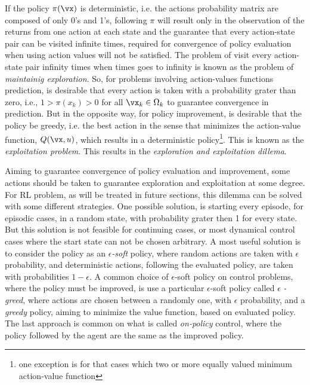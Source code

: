 If the policy $\pi(\vx)$ is deterministic, i.e. the actions probability matrix are composed of only 0's and 1's, following $ \pi$ will result only in the observation of the returns from one action at each state and the guarantee that every action-state pair can be visited infinite times, required for convergence of policy evaluation when using action values will not be satisfied.
The problem of visit every action-state pair infinity times when times goes to infinity is known as the problem of \textit{maintainig exploration}. So, for problems involving action-values functions prediction, is desirable that every action is taken with a probability grater than zero, i.e., $1 > \pi(x_k) > 0$ for all $\vx_k \in \Omega_k$ to guarantee convergence in prediction. But in the opposite way, for policy improvement, is desirable that the policy be greedy, i.e. the best action in the sense that minimizes the action-value function, $Q(\vx,u)$, which results in a deterministic policy\footnote{one exception is for that cases which two or more equally valued minimum action-value function}. This is known as the \textit{exploitation problem}. This results in the \textit{exploration and exploitation dillema}.

Aiming to guarantee convergence of policy evaluation and improvement, some actions should be taken to guarantee exploration and exploitation at some degree. For RL problem, as will be treated in future sections, this dilemma can be solved with some different strategies.
One possible solution, is starting every episode, for episodic cases, in a random state, with probability grater then 1 for every state. But this solution is not feasible for continuing cases, or most dynamical control cases where the start state can not be chosen arbitrary. A most useful solution is to consider the policy as an \textit{$\epsilon$-soft} policy, where random actions are taken with $\epsilon$ probability, and deterministic actions, following the evaluated policy, are taken with probabilities  $1-\epsilon$. A common choice of  $\epsilon$-soft policy on control problems, where the policy must be improved, is use a particular  $\epsilon$-soft policy called  $\epsilon$ \textit{-greed}, where actions are chosen between a randomly one, with $\epsilon$ probability, and a \textit{greedy} policy, aiming to minimize the value function, based on evaluated policy.  
The last approach is common on what is called \textit{on-policy} control, where the policy followed by the agent are the same as the improved policy. 

